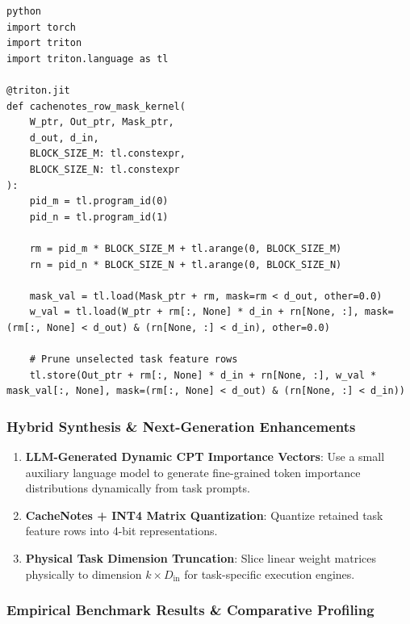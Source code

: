 \vspace{0.5em}
\begin{mdframed}[backgroundcolor=codebg, linecolor=codeframe, linewidth=1pt, roundcorner=4pt, innerleftmargin=2pt, innerrightmargin=5pt, innertopmargin=5pt, innerbottommargin=5pt]
\begin{lstlisting}
python
import torch
import triton
import triton.language as tl

@triton.jit
def cachenotes_row_mask_kernel(
    W_ptr, Out_ptr, Mask_ptr,
    d_out, d_in,
    BLOCK_SIZE_M: tl.constexpr,
    BLOCK_SIZE_N: tl.constexpr
):
    pid_m = tl.program_id(0)
    pid_n = tl.program_id(1)

    rm = pid_m * BLOCK_SIZE_M + tl.arange(0, BLOCK_SIZE_M)
    rn = pid_n * BLOCK_SIZE_N + tl.arange(0, BLOCK_SIZE_N)

    mask_val = tl.load(Mask_ptr + rm, mask=rm < d_out, other=0.0)
    w_val = tl.load(W_ptr + rm[:, None] * d_in + rn[None, :], mask=(rm[:, None] < d_out) & (rn[None, :] < d_in), other=0.0)

    # Prune unselected task feature rows
    tl.store(Out_ptr + rm[:, None] * d_in + rn[None, :], w_val * mask_val[:, None], mask=(rm[:, None] < d_out) & (rn[None, :] < d_in))
\end{lstlisting}
\end{mdframed}
\vspace{0.5em}


\subsubsection*{Hybrid Synthesis \& Next-Generation Enhancements}

\begin{enumerate}
\item \textbf{LLM-Generated Dynamic CPT Importance Vectors}: Use a small auxiliary language model to generate fine-grained token importance distributions dynamically from task prompts.
\item \textbf{CacheNotes + INT4 Matrix Quantization}: Quantize retained task feature rows into 4-bit representations.
\item \textbf{Physical Task Dimension Truncation}: Slice linear weight matrices physically to dimension $k \times D_{\text{in}}$ for task-specific execution engines.

\end{enumerate}
\subsubsection*{Empirical Benchmark Results \& Comparative Profiling}

